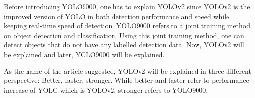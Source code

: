 \documentclass{article}
\begin{document}
\setlength{\parindent}{6ex}

\indent

Before introducing YOLO9000, one has to explain YOLOv2 since YOLOv2 is the 
improved version of YOLO in both detection performance and speed while keeping 
real-time speed of detection. YOLO9000 refers to a joint training method on 
object detection and classification. Using this joint training method, one can 
detect objects that do not have any labelled detection data. Now, YOLOv2 will be 
explained and later, YOLO9000 will be explained. \par

As the name of the article suggested, YOLOv2 will be explained in three 
different perspective: Better, faster, stronger. While better and faster 
refer to performance increase of YOLO which is YOLOv2, stronger refers to 
YOLO9000. 
\end{document}
